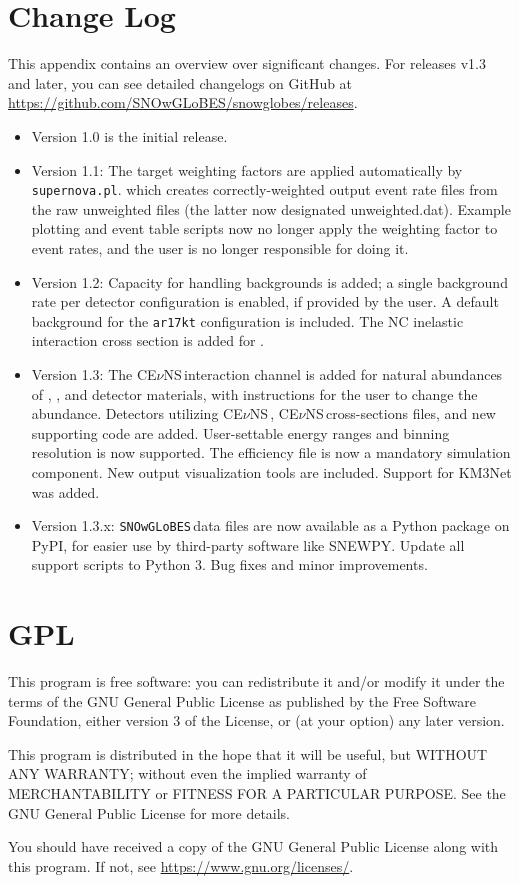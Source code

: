 \documentclass{article}
\newcommand{\cev}{CE$\nu$NS\,}
\newcommand{\snow}{\texttt{SNOwGLoBES}\,}
\begin{document}
\begin{appendices}
\section{Change Log}

This appendix contains an overview over significant changes.
For releases v1.3 and later, you can see detailed changelogs on GitHub at \url{https://github.com/SNOwGLoBES/snowglobes/releases}.

\begin{itemize}
    \item Version 1.0 is the initial release.
    \item Version 1.1: The target weighting factors are applied automatically by \texttt{supernova.pl}. which creates correctly-weighted output event rate files from the raw unweighted files (the latter now designated unweighted.dat). Example plotting and event table scripts now no longer apply the weighting factor to event rates, and the user is no longer responsible for doing it.
    \item Version 1.2: Capacity for handling backgrounds is added; a single background rate per detector configuration is enabled, if provided by the user. A default background for the \texttt{ar17kt} configuration is included. The NC inelastic interaction cross section is added for .
    \item Version 1.3: The \cev interaction channel is added for natural abundances of , , and  detector materials, with instructions for the user to change the abundance. Detectors utilizing \cev, \cev cross-sections files, and new supporting code are added. User-settable energy ranges and binning resolution is now supported. The efficiency file is now a mandatory simulation component. New output visualization tools are included. Support for KM3Net was added.
    \item Version 1.3.x: \snow data files are now available as a Python package on PyPI, for easier use by third-party software like SNEWPY. Update all support scripts to Python 3. Bug fixes and minor improvements.
\end{itemize}

\section{GPL}
This program is free software: you can redistribute it and/or modify it under the terms of the GNU General Public License as published by the Free Software Foundation, either version 3 of the License, or (at your option) any later version.

This program is distributed in the hope that it will be useful, but WITHOUT ANY WARRANTY; without even the implied warranty of MERCHANTABILITY or FITNESS FOR A PARTICULAR PURPOSE.  See the GNU General Public License for more details.

You should have received a copy of the GNU General Public License along with this program.  If not, see \url{https://www.gnu.org/licenses/}.
\end{appendices}
\end{document}
